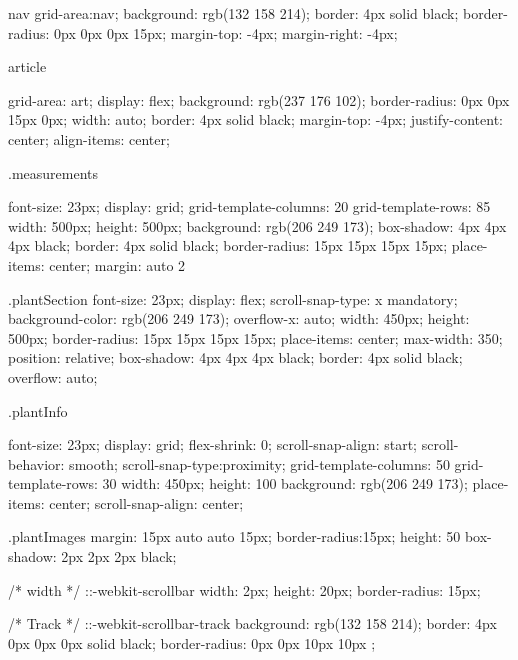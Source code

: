 \documentclass[12pt]{article} %
\begin{document}
\begin{htmlcode}[caption={CSS Stlye Sheet}]
    nav 
    {
       grid-area:nav;
       background: rgb(132 158 214);
       border: 4px solid black;
       border-radius: 0px 0px 0px 15px;
       margin-top: -4px;
       margin-right: -4px;    
    }
         
    article
    {
       grid-area: art;
       display: flex;
       background: rgb(237 176 102);
       border-radius: 0px 0px 15px 0px;
       width: auto;
       border: 4px solid black;
       margin-top: -4px;
       justify-content: center;
       align-items: center;
        
    }
    
    
    .measurements
    {
       font-size: 23px;
       display: grid;
       grid-template-columns: 20%
       grid-template-rows: 85%
       width: 500px;
       height: 500px;
       background: rgb(206 249 173);
       box-shadow: 4px 4px 4px black;
       border: 4px solid black;
       border-radius: 15px 15px 15px 15px;
       place-items: center;
       margin: auto 2%
    
    }
    
    .plantSection
    {
       font-size: 23px;
       display: flex;
       scroll-snap-type: x mandatory;
       background-color: rgb(206 249 173);
       overflow-x: auto;
       width: 450px;
       height: 500px;
       border-radius: 15px 15px 15px 15px;
       place-items: center;
       max-width: 350;
       position: relative;
       box-shadow: 4px 4px 4px black;
       border: 4px solid black;
       overflow: auto;
    }
    
    
    
    .plantInfo
    {
       font-size: 23px;
       display: grid;
       flex-shrink: 0;
       scroll-snap-align: start;
       scroll-behavior: smooth;
       scroll-snap-type:proximity;
       grid-template-columns: 50%
       grid-template-rows: 30%
       width: 450px;
       height: 100%
       background: rgb(206 249 173);
       place-items: center;
       scroll-snap-align: center;
     
    
    }
    
    .plantImages
    {
    margin: 15px auto auto 15px;
    border-radius:15px;
    height: 50%
    box-shadow: 2px 2px 2px black;
    }
    
    /* width */
    ::-webkit-scrollbar {
       width: 2px;
       height: 20px;
       border-radius: 15px;
     }
     
     /* Track */
     ::-webkit-scrollbar-track {
       background: rgb(132 158 214);
       border: 4px 0px 0px 0px solid black;
       border-radius: 0px 0px 10px 10px  ;
     }
     

\end{htmlcode}
\end{document}

